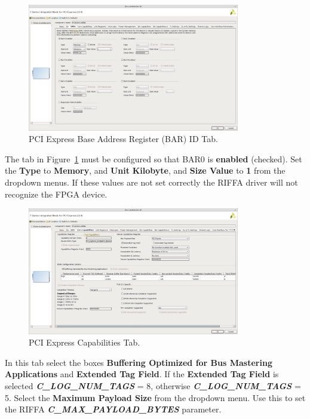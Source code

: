 \documentclass{refrep}
\newcommand{\ConfigSetting}[1]{\textbf{#1}}
\newcommand{\RIFFAParameter}[1]{\textit{\textbf{#1}}}
\begin{document}
\begin{figure}[H]
  \includegraphics[width=350px,center]{7SeriesIntegratedTabBARs.png}
  \caption{PCI Express Base Address Register (BAR) ID Tab.}
  \label{Fig:7SeriesIntegrated:Generating:7SeriesIntegratedTabBARs}
\end{figure}
The tab in
Figure~\ref{Fig:7SeriesIntegrated:Generating:7SeriesIntegratedTabBARs} must be
configured so that BAR0 is \ConfigSetting{enabled} (checked). Set the
\ConfigSetting{Type} to \ConfigSetting{Memory}, and \ConfigSetting{Unit}
\ConfigSetting{Kilobyte}, and \ConfigSetting{Size Value} to \ConfigSetting{1}
from the dropdown menus. If these values are not set correctly the RIFFA driver
will not recognize the FPGA device.

\begin{figure}[H]
  \includegraphics[width=350px,center]{7SeriesIntegratedTabCapabilities.png}
  \caption{PCI Express Capabilities Tab.}
  \label{Fig:7SeriesIntegrated:Generating:7SeriesIntegratedTabCapabilities}
\end{figure}
In this tab select the boxes \ConfigSetting{Buffering Optimized for Bus
  Mastering Applications} and \ConfigSetting{Extended Tag Field}. If the
\ConfigSetting{Extended Tag Field} is selected
\RIFFAParameter{C\_LOG\_NUM\_TAGS} = 8, otherwise
\RIFFAParameter{C\_LOG\_NUM\_TAGS} = 5. Select the \ConfigSetting{Maximum
  Payload Size} from the dropdown menu. Use this to set the RIFFA
\RIFFAParameter{C\_MAX\_PAYLOAD\_BYTES} parameter.
\end{document}
